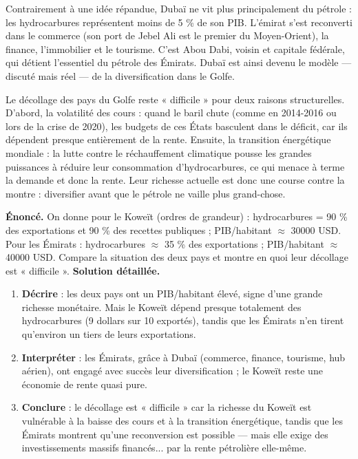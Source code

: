 \documentclass[11pt]{article}
\newcommand{\cle}[1]{{\popxbold\color{popdark}#1}}
\newcounter{popsec}
\newcounter{popsub}
\newcommand{\courssub}[1]{%
  \stepcounter{popsub}%
  \par\vspace{9pt}\noindent{\popxbold\fontsize{11.5}{13}\selectfont\color{popink}{\color{poporange}\thepopsec.\thepopsub}\hspace{6pt}#1}\par\nopagebreak\vspace{4pt}
}
\begin{document}
\begin{savaistu}
Contrairement à une idée répandue, Dubaï ne vit plus principalement du pétrole : les hydrocarbures représentent moins de 5 \% de son PIB. L'émirat s'est reconverti dans le commerce (son port de Jebel Ali est le premier du Moyen-Orient), la finance, l'immobilier et le tourisme. C'est Abou Dabi, voisin et capitale fédérale, qui détient l'essentiel du pétrole des Émirats. Dubaï est ainsi devenu le modèle — discuté mais réel — de la diversification dans le Golfe.
\end{savaistu}

\courssub{Un décollage « difficile » car fragile}

Le décollage des pays du Golfe reste « difficile » pour deux raisons structurelles. D'abord, la \cle{volatilité des cours} : quand le baril chute (comme en 2014-2016 ou lors de la crise de 2020), les budgets de ces États basculent dans le déficit, car ils dépendent presque entièrement de la rente. Ensuite, la \cle{transition énergétique mondiale} : la lutte contre le réchauffement climatique pousse les grandes puissances à réduire leur consommation d'hydrocarbures, ce qui menace à terme la demande et donc la rente. Leur richesse actuelle est donc une course contre la montre : diversifier avant que le pétrole ne vaille plus grand-chose.

\begin{exoresolu}
\textbf{Énoncé.} On donne pour le Koweït (ordres de grandeur) : hydrocarbures = 90 \% des exportations et 90 \% des recettes publiques ; PIB/habitant $\approx$ \num{30000} USD. Pour les Émirats : hydrocarbures $\approx$ 35 \% des exportations ; PIB/habitant $\approx$ \num{40000} USD. Compare la situation des deux pays et montre en quoi leur décollage est « difficile ».
\tcblower
\textbf{Solution détaillée.}
\begin{enumerate}
\item \textbf{Décrire} : les deux pays ont un PIB/habitant élevé, signe d'une grande richesse monétaire. Mais le Koweït dépend presque totalement des hydrocarbures (9 dollars sur 10 exportés), tandis que les Émirats n'en tirent qu'environ un tiers de leurs exportations.
\item \textbf{Interpréter} : les Émirats, grâce à Dubaï (commerce, finance, tourisme, hub aérien), ont engagé avec succès leur diversification ; le Koweït reste une économie de rente quasi pure.
\item \textbf{Conclure} : le décollage est « difficile » car la richesse du Koweït est vulnérable à la baisse des cours et à la transition énergétique, tandis que les Émirats montrent qu'une reconversion est possible — mais elle exige des investissements massifs financés... par la rente pétrolière elle-même.
\end{enumerate}
\end{exoresolu}
\end{document}
